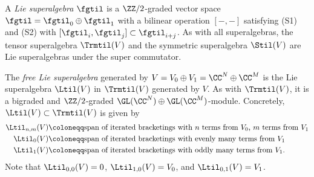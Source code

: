 A \emph{Lie superalgebra} $\fgtil$ is a $\ZZ/2$-graded vector space $\fgtil = \fgtil_0 \oplus \fgtil_1$ with a bilinear operation $[-, -]$ satisfying (S1) and (S2) with $[\fgtil_i, \fgtil_j] \subset \fgtil_{i+j}$. As with all superalgebras, the tensor superalgebra $\Trmtil(V)$ and the symmetric superalgebra $\Stil(V)$ are Lie superalgebras under the super commutator.

\begin{exam}
    The \textit{free Lie superalgebra} generated by $V = V_0 \oplus V_1 = \CC^N \oplus \CC^M$ is the Lie superalgebra $\Ltil(V)$ in $\Trmtil(V)$ generated by $V$. As with $\Trmtil(V)$, it is a bigraded and $\ZZ/2$-graded $\GL(\CC^N) \oplus \GL(\CC^M)$-module. Concretely, $\Ltil(V) \subset \Trmtil(V)$ is given by
    \begin{align*}
        \Ltil_{n, m}(V) &\coloneqq \text{span of iterated bracketings with $n$ terms from $V_0$, $m$ terms from $V_1$} \\
        \Ltil_0(V) &\coloneqq \text{span of iterated bracketings with evenly many terms from $V_1$} \\
        \Ltil_1(V) &\coloneqq \text{span of iterated bracketings with oddly many terms from $V_1$}.
    \end{align*}
    Note that $\Ltil_{0, 0}(V) = 0$, $\Ltil_{1, 0}(V) = V_0$, and $\Ltil_{0, 1}(V) = V_1$.
\end{exam}

